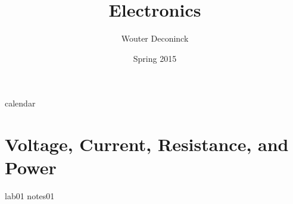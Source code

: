 \documentclass{book}
\title{Electronics}
\date{Spring 2015}
\author{Wouter Deconinck}
\begin{document}
\maketitle

{calendar}

\tableofcontents

\chapter{Voltage, Current, Resistance, and Power}
%
{lab01}
{notes01}

% 
% 

% 
% 

% 
% 

% 
% 

% 
% 
\end{document}
